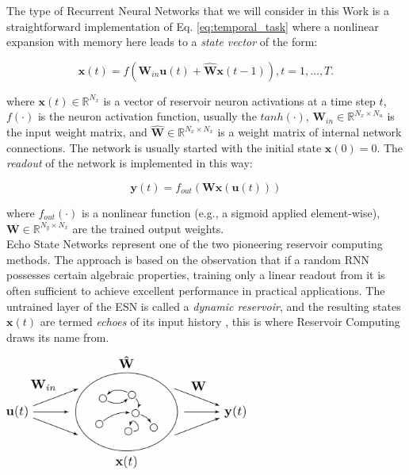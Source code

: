 The type of Recurrent Neural Networks that we will consider in this Work is a straightforward implementation of Eq. \ref{eq:temporal_task} where a nonlinear expansion with memory here leads to a \textit{state vector} of the form:

\begin{equation}\label{eq:reservoir_state}
    \textbf{x}(t)=f(\textbf{W}_{in}\textbf{u}(t)+\widehat{\textbf{W}}\textbf{x}(t-1)), t=1,\dots , T.
\end{equation}

where $\textbf{x}(t) \in \mathbb{R}^{N_x}$ is a vector of reservoir neuron activations at a time step $t$, $f(\cdot)$ is the neuron activation function, usually the $tanh(\cdot)$, $\textbf{W}_{in} \in \mathbb{R}^{N_x \times N_u}$ is the input weight matrix, and $\widehat{\textbf{W}} \in \mathbb{R}^{N_x \times N_x}$ is a weight matrix of internal network connections. The network is usually started with the initial state $\textbf{x}(0)=0$.
The \textit{readout} of the network is implemented in this way:

\begin{equation}\label{eq:readout}
    \textbf{y}(t)=f_{out}(\textbf{W}\textbf{x}(\textbf{u}(t)))
\end{equation}

where $f_{out}(\cdot)$ is a nonlinear function (e.g., a sigmoid applied element-wise), $\textbf{W} \in \mathbb{R}^{N_y \times N_x}$ are the trained output weights. \\

Echo State Networks \cite{jaeger2007echo} represent one of the two pioneering reservoir computing methods. The approach is based on the observation that if a random RNN possesses certain algebraic properties, training only a linear readout from it is often sufficient to achieve excellent performance in practical applications. The untrained layer of the ESN is called a \textit{dynamic reservoir}, and the resulting states $\textbf{x}(t)$ are termed \textit{echoes} of its input history \cite{jaeger2001echo}, this is where Reservoir Computing draws its name from. \\

\begin{center}
\begin{minipage}[c]{\textwidth}
    \centering
    \includegraphics[width=0.6\textwidth]{contents/Chapter2/esn-arch.png}
    \label{fig:esn_arch}
\end{minipage}
\end{center}

